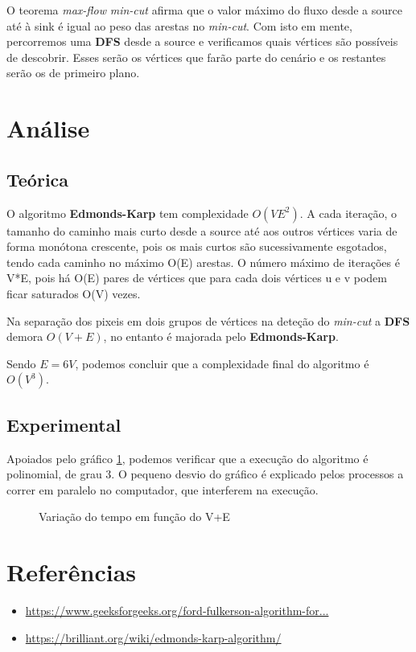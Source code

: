 \documentclass[12pt,a4paper]{article}
\begin{document}
O teorema \textit{max-flow} \textit{min-cut} afirma que o valor máximo do fluxo desde a source até à sink é igual ao peso das arestas no
\textit{min-cut}. Com isto em mente, percorremos uma \textbf{DFS} desde a source e verificamos quais vértices são possíveis de descobrir.
Esses serão os vértices que farão parte do cenário e os restantes serão os de primeiro plano.

\section{Análise}
\subsection{Teórica}
O algoritmo \textbf{Edmonds-Karp} tem complexidade $O(V{E}^2)$. A cada iteração, o tamanho do caminho mais curto desde a source até
aos outros vértices varia de forma monótona crescente, pois os mais curtos são sucessivamente esgotados, tendo cada
caminho no máximo O(E) arestas. O número máximo de iterações é V*E, pois há O(E) pares de vértices que para cada dois
vértices u e v podem ficar saturados O(V) vezes.

Na separação dos pixeis em dois grupos de vértices na deteção do \textit{min-cut} a \textbf{DFS} demora $O(V+E)$, no entanto é majorada
pelo \textbf{Edmonds-Karp}.

Sendo $E=6V$, podemos concluir que a complexidade final do algoritmo é $O({V}^3)$.

\subsection{Experimental}
Apoiados pelo gráfico \ref{g1}, podemos verificar que a execução do algoritmo é polinomial, de grau 3.
O pequeno desvio do gráfico é explicado pelos processos a correr em paralelo no computador, que interferem na execução.

\begin{figure}[h]
			\centering
			\caption{Variação do tempo em função do V+E}
			\label{g1}
\end{figure}

\section{Referências}
\begin{itemize}
	\item \href{https://www.geeksforgeeks.org/ford-fulkerson-algorithm-for-maximum-flow-problem/}{https://www.geeksforgeeks.org/ford-fulkerson-algorithm-for...}
	\item \href{https://brilliant.org/wiki/edmonds-karp-algorithm/}{https://brilliant.org/wiki/edmonds-karp-algorithm/}
\end{itemize}
\end{document}
